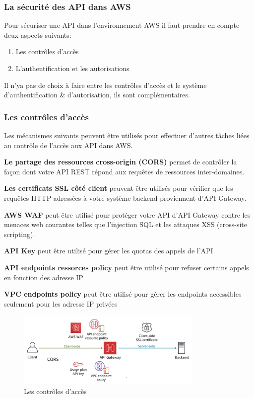 \subsubsection{La sécurité des API dans AWS}
Pour sécuriser une API dans l'environnement AWS il faut prendre en compte deux aspects suivants: 
\begin{enumerate}
\item Les contrôles d'accès 
\item L'authentification et les autorisations
\end{enumerate}
Il n'ya pas de choix à faire entre les contrôles d'accès et le système d'authentification \& d'autorisation, ils sont complémentaires.
\subsubsection{Les contrôles d'accès}
Les mécanismes suivants peuvent être utilisés pour effectuer d'autres tâches liées au contrôle de l'accès aux API dans AWS.
\begin{list}{•}
\item \textbf{Le partage des ressources cross-origin (CORS)}  permet de contrôler la façon dont votre API REST répond aux requêtes de ressources inter-domaines. 
\item
\item \textbf{Les certificats SSL côté client} peuvent être utilisés pour vérifier que les requêtes HTTP adressées à votre système backend proviennent d'API Gateway.
\item \textbf{AWS WAF} peut être utilisé pour protéger votre API d'API Gateway contre les menaces web courantes telles que l'injection SQL et les attaques XSS (cross-site 
scripting). 
\item \textbf{API Key} peut être utilisé pour gérer les quotas des appels de l'API
\item \textbf{API endpoints  ressorces policy} peut être utilisé pour refuser certains appels en fonction des adresse IP
\item \textbf{VPC endpoints policy } peut être utilisé pour gérer les endpoints accessibles seulement pour les adresse IP privées
\end{list}
 \begin{figure}[H]
            \centering
                \includegraphics[width=0.8\textwidth]{Figures/controleaccess}
	       \decoRule
		\caption[Les contrôles d'accès]{Les contrôles d'accès}
	\label{fig:Les contrôles d'accès}
	\end{figure}
